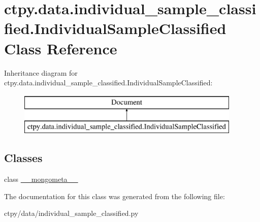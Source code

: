 \hypertarget{classctpy_1_1data_1_1individual__sample__classified_1_1_individual_sample_classified}{\section{ctpy.\-data.\-individual\-\_\-sample\-\_\-classified.\-Individual\-Sample\-Classified Class Reference}
\label{classctpy_1_1data_1_1individual__sample__classified_1_1_individual_sample_classified}
}
Inheritance diagram for ctpy.\-data.\-individual\-\_\-sample\-\_\-classified.\-Individual\-Sample\-Classified\-:\begin{figure}[H]
\begin{center}
\leavevmode
\includegraphics[height=2.000000cm]{classctpy_1_1data_1_1individual__sample__classified_1_1_individual_sample_classified}
\end{center}
\end{figure}
\subsection*{Classes}
\begin{DoxyCompactItemize}
\item 
class \hyperlink{classctpy_1_1data_1_1individual__sample__classified_1_1_individual_sample_classified_1_1____mongometa____}{\-\_\-\-\_\-mongometa\-\_\-\-\_\-}
\end{DoxyCompactItemize}


The documentation for this class was generated from the following file\-:\begin{DoxyCompactItemize}
\item 
ctpy/data/individual\-\_\-sample\-\_\-classified.\-py\end{DoxyCompactItemize}
